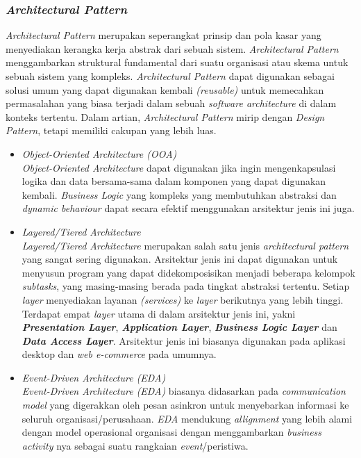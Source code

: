 \documentclass[a4paper]{article}
\newcommand{\subsubbab}[1]{%
    \subsubsection{#1}%
}
\begin{document}
\subsubbab{\textit{Architectural Pattern}}
\textit{Architectural Pattern} merupakan seperangkat prinsip dan pola kasar yang menyediakan kerangka kerja abstrak dari sebuah sistem. \textit{Architectural Pattern} menggambarkan struktural fundamental dari suatu organisasi atau skema untuk sebuah sistem yang kompleks. \textit{Architectural Pattern} dapat digunakan sebagai solusi umum yang dapat digunakan kembali \textit{(reusable)} untuk memecahkan permasalahan yang biasa terjadi dalam sebuah \textit{software architecture} di dalam konteks tertentu\autocite[13]{architectural-pattern}. Dalam artian, \textit{Architectural Pattern} mirip dengan \textit{Design Pattern}, tetapi memiliki cakupan yang lebih luas\autocite{archi-pattern}.
\begin{itemize}
    \item \textit{Object-Oriented Architecture (OOA)}\\
          \textit{Object-Oriented Architecture} dapat digunakan jika ingin mengenkapsulasi logika dan data bersama-sama dalam komponen yang dapat digunakan kembali. \textit{Business Logic} yang kompleks yang membutuhkan abstraksi dan \textit{dynamic behaviour} dapat secara efektif menggunakan arsitektur jenis ini juga\autocite[14]{architectural-pattern}.
    \item \textit{Layered/Tiered Architecture}\\
          \textit{Layered/Tiered Architecture} merupakan salah satu jenis \textit{architectural pattern} yang sangat sering digunakan\autocite[19-20]{architectural-pattern}. Arsitektur jenis ini dapat digunakan untuk menyusun program yang dapat didekomposisikan menjadi beberapa kelompok \textit{subtasks}, yang masing-masing berada pada tingkat abstraksi tertentu. Setiap \textit{layer} menyediakan layanan \textit{(services)} ke \textit{layer} berikutnya yang lebih tinggi. Terdapat empat \textit{layer} utama di dalam arsitektur jenis ini, yakni \textbf{\textit{Presentation Layer}}, \textbf{\textit{Application Layer}}, \textbf{\textit{Business Logic Layer}} dan \textbf{\textit{Data Access Layer}}. Arsitektur jenis ini biasanya digunakan pada aplikasi desktop dan \textit{web e-commerce} pada umumnya\autocite{archi-pattern}.
    \item \textit{Event-Driven Architecture (EDA)}\\
          \textit{Event-Driven Architecture (EDA)} biasanya didasarkan pada \textit{communication model} yang digerakkan oleh pesan asinkron untuk menyebarkan informasi ke seluruh organisasi/perusahaan. \textit{EDA} mendukung \textit{allignment} yang lebih alami dengan model operasional organisasi dengan menggambarkan \textit{business activity} nya sebagai suatu rangkaian \textit{event}/peristiwa\autocite[20-24]{architectural-pattern}.

\end{itemize}
\end{document}
